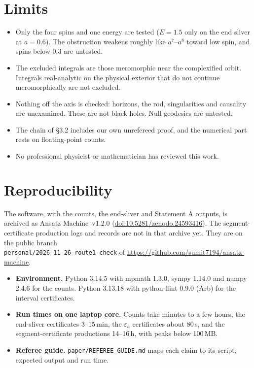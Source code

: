 \documentclass[11pt,a4paper]{article}
\begin{document}
\section{Limits}
\begin{itemize}
\item Only the four spins and one energy are tested ($E=1.5$ only on the end sliver at $a=0.6$). The obstruction
weakens roughly like $a^7$--$a^8$ toward low spin, and spins below 0.3 are untested.
\item The excluded integrals are those meromorphic near the complexified orbit. Integrals real-analytic on the
physical exterior that do not continue meromorphically are not excluded.
\item Nothing off the axis is checked: horizons, the rod, singularities and causality are unexamined. These are not
black holes. Null geodesics are untested.
\item The chain of \S3.2 includes our own unrefereed proof, and the numerical part rests on floating-point counts.
\item No professional physicist or mathematician has reviewed this work.
\end{itemize}

\section{Reproducibility}
The software, with the counts, the end-sliver and Statement A outputs, is archived as Ansatz Machine~v1.2.0
(\href{https://doi.org/10.5281/zenodo.24593416}{doi:10.5281/zenodo.24593416}). The segment-certificate production logs and
records are not in that archive yet. They are on the public branch\\
\texttt{personal/2026-11-26-route1-check} of \url{https://github.com/sumit7194/ansatz-machine}.
\begin{itemize}
\item \textbf{Environment.} Python 3.14.5 with mpmath 1.3.0, sympy 1.14.0 and numpy 2.4.6 for the counts. Python
3.13.18 with python-flint 0.9.0 (Arb) for the interval certificates.
\item \textbf{Run times on one laptop core.} Counts take minutes to a few hours, the end-sliver certificates
3--15\,min, the $\varepsilon_a$ certificates about 80\,s, and the segment-certificate productions 14--16\,h, with peaks below
100\,MB.
\item \textbf{Referee guide.} \texttt{paper/REFEREE\_GUIDE.md} maps each claim to its script, expected output and
run time.
\end{itemize}
\end{document}
